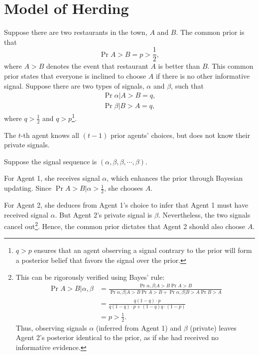 
\section{Model of Herding}

Suppose there are two restaurants in the town, $A$ and $B$. The common prior is that 
\[
\Pr{A>B} = p>\frac{1}{2},
\]
where $A>B$ denotes the event that restaurant $A$ is better than $B$. This common prior states that everyone is inclined to choose $A$ if there is no other informative signal. Suppose there are two types of signals, $\alpha$ and $\beta$, such that
\[
\begin{aligned}
  \Pr{\alpha|A>B} = q,\\
  \Pr{\beta|B>A} = q,
\end{aligned}
\]
where $q>\frac{1}{2}$ and $q>p$\footnote{
  $q>p$ ensures that an agent observing a signal contrary to the prior will form a posterior belief that favors the signal over the prior.
}.

The $t$-th agent knows all $(t-1)$ prior agents' choices, but does not know their private signals. 

Suppose the signal sequence is $(\alpha,\beta,\beta,\cdots,\beta)$.

For Agent 1, she receives signal $\alpha$, which enhances the prior through Bayesian updating. Since $\Pr{A>B|\alpha} > \frac{1}{2}$, she chooses $A$. 

For Agent 2, she deduces from Agent 1's choice to infer that Agent 1 must have received signal $\alpha$. But Agent 2's private signal is $\beta$. Nevertheless, the two signals cancel out\footnote{
  This can be rigorously verified using Bayes' rule:
  \[
  \begin{aligned}
    \Pr{A>B|\alpha,\beta} &= \frac{\Pr{\alpha,\beta|A>B}\Pr{A>B}}{\Pr{\alpha,\beta|A>B}\Pr{A>B} + \Pr{\alpha,\beta|B>A}\Pr{B>A}}\\
    &= \frac{q(1-q) \cdot p}{q(1-q) \cdot p + (1-q)q \cdot (1-p)}\\
    &= p > \frac{1}{2}.
  \end{aligned}
  \]
  Thus, observing signals $\alpha$ (inferred from Agent 1) and $\beta$ (private) leaves Agent 2's posterior identical to the prior, as if she had received no informative evidence.
}. Hence, the common prior dictates that Agent 2 should also choose $A$.

